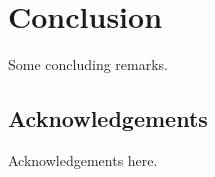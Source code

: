 \documentclass[12pt]{article}
\theoremstyle{plain}
\theoremstyle{definition}
\theoremstyle{remark}
\begin{document}
\section{Conclusion}
  Some concluding remarks.


\subsection*{Acknowledgements}
  Acknowledgements here.


%  
%  

\begin{thebibliography}{10}

\end{thebibliography}
\end{document}
